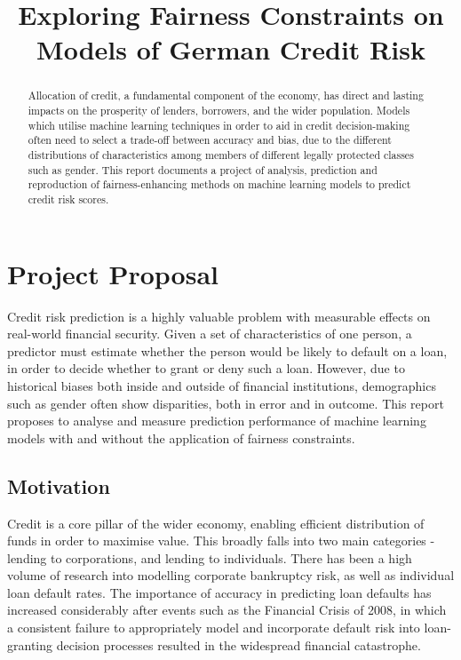 \documentclass[conference]{IEEEtran}
\begin{document}
\title{Exploring Fairness Constraints on Models of German Credit Risk}

\author{
}

\maketitle

\begin{abstract}
    Allocation of credit, a fundamental component of the economy, has direct and lasting impacts on the prosperity of lenders, borrowers, and the wider population. Models which utilise machine learning techniques in order to aid in credit decision-making often need to select a trade-off between accuracy and bias, due to the different distributions of characteristics among members of different legally protected classes such as gender. This report documents a project of analysis, prediction and reproduction of fairness-enhancing methods on machine learning models to predict credit risk scores.
\end{abstract}
\section{Project Proposal}
Credit risk prediction is a highly valuable problem with measurable effects on real-world financial security. Given a set of characteristics of one person, a predictor must estimate whether the person would be likely to default on a loan, in order to decide whether to grant or deny such a loan. However, due to historical biases both inside and outside of financial institutions, demographics such as gender often show disparities, both in error and in outcome. This report proposes to analyse and measure prediction performance of machine learning models with and without the application of fairness constraints.
\subsection{Motivation}
Credit is a core pillar of the wider economy, enabling efficient distribution of funds in order to maximise value. This broadly falls into two main categories - lending to corporations, and lending to individuals. There has been a high volume of research into modelling corporate bankruptcy risk\cite{article}\cite{provenzano2020machine}, as well as individual loan default rates\cite{gcr}. The importance of accuracy in predicting loan defaults has increased considerably after events such as the Financial Crisis of 2008, in which a consistent failure to appropriately model and incorporate default risk into loan-granting decision processes resulted in the widespread financial catastrophe.
\end{document}
